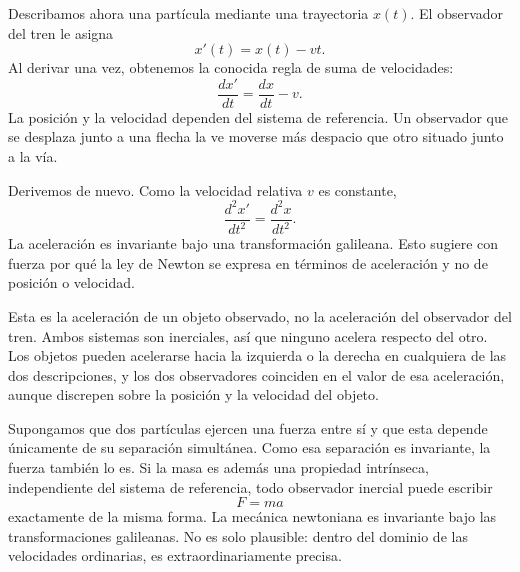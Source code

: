 \begin{classroomqa}\end{classroomqa}

Describamos ahora una partícula mediante una trayectoria \(x(t)\). El observador del tren le asigna
\begin{equation}
x'(t)=x(t)-vt.
\end{equation}
Al derivar una vez, obtenemos la conocida regla de suma de velocidades:
\begin{equation}
\frac{dx'}{dt}=\frac{dx}{dt}-v.
\end{equation}
La posición y la velocidad dependen del sistema de referencia. Un observador que se desplaza junto a una flecha la ve moverse más despacio que otro situado junto a la vía.

Derivemos de nuevo. Como la velocidad relativa \(v\) es constante,
\begin{equation}
\frac{d^2x'}{dt^2}=\frac{d^2x}{dt^2}.
\end{equation}
La aceleración es invariante bajo una transformación galileana. Esto sugiere con fuerza por qué la ley de Newton se expresa en términos de aceleración y no de posición o velocidad.

Esta es la aceleración de un objeto observado, no la aceleración del observador del tren. Ambos sistemas son inerciales, así que ninguno acelera respecto del otro. Los objetos pueden acelerarse hacia la izquierda o la derecha en cualquiera de las dos descripciones, y los dos observadores coinciden en el valor de esa aceleración, aunque discrepen sobre la posición y la velocidad del objeto.

Supongamos que dos partículas ejercen una fuerza entre sí y que esta depende únicamente de su separación simultánea. Como esa separación es invariante, la fuerza también lo es. Si la masa es además una propiedad intrínseca, independiente del sistema de referencia, todo observador inercial puede escribir
\begin{equation}
F=ma
\end{equation}
exactamente de la misma forma. La mecánica newtoniana es invariante bajo las transformaciones galileanas. No es solo plausible: dentro del dominio de las velocidades ordinarias, es extraordinariamente precisa.

